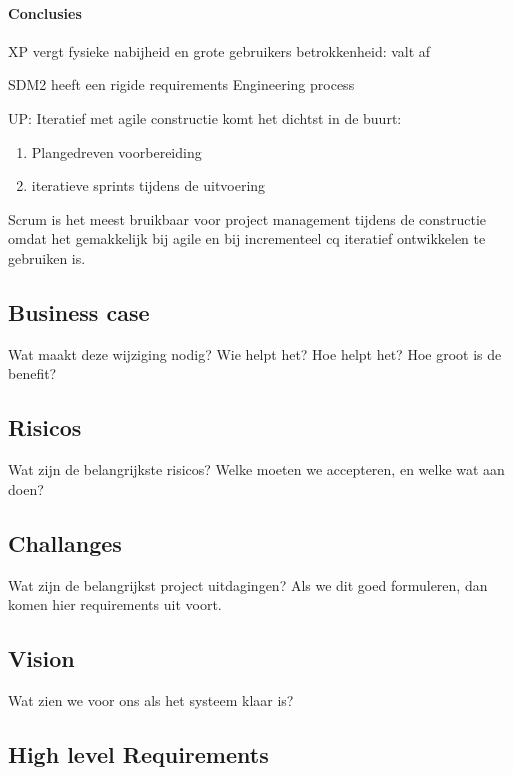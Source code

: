\documentclass[a4paper,11pt,twoside,draft]{article}
\begin{document}
\paragraph{Conclusies}
\begin{description}
\item XP vergt fysieke nabijheid en grote gebruikers betrokkenheid: valt af
\item SDM2 heeft een rigide requirements Engineering process
\item UP: Iteratief met agile constructie komt het dichtst in de buurt:
\begin{enumerate}
 \item Plangedreven voorbereiding
 \item iteratieve sprints tijdens de uitvoering
\end{enumerate}
\end{description}

Scrum is het meest bruikbaar voor project management tijdens de constructie omdat
het gemakkelijk bij agile en bij incrementeel cq iteratief ontwikkelen te gebruiken is.

\subsection{Business case}

Wat maakt deze wijziging nodig? Wie helpt het? Hoe helpt het?
Hoe groot is de benefit?

\subsection{Risicos}

Wat zijn de belangrijkste risicos? Welke moeten we accepteren, en welke wat aan doen?


\subsection{Challanges}

Wat zijn de belangrijkst project uitdagingen? Als we dit goed formuleren, dan komen hier
requirements uit voort.

\subsection{Vision}

Wat zien we voor ons als het systeem klaar is?

\subsection{High level Requirements}
\end{document}
